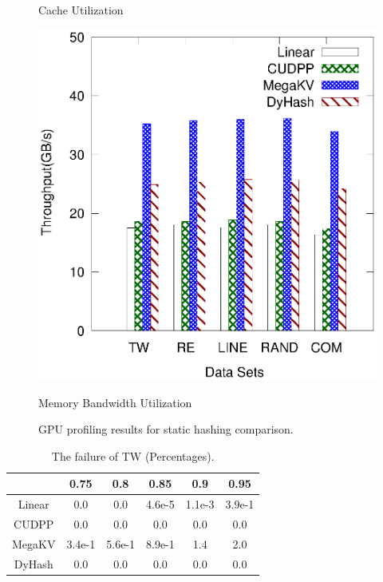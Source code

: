\begin{figure}[h]
\begin{minipage}{0.3\linewidth}
	\centerline{Cache Utilization}
\end{minipage}
	\hfill
	\begin{minipage}{0.3\linewidth}\centering
	\includegraphics[width=\linewidth]{pic/static-profi/memory-read.eps}
	\centerline{Memory Bandwidth Utilization}
	\end{minipage}
	\caption{GPU profiling results for static hashing comparison.}
	\label{fig:static:profile}
\end{figure}



\begin{table}[H]
 	\caption{The failure of TW (Percentages).}
	\centering
       \begin{tabular}{|c|c|c|c|c|c|}
		\hline
		       & 0.75 & 0.8 & 0.85 & 0.9 & 0.95\\ \hline
		Linear &0.0 & 0.0 &4.6e-5  & 1.1e-3 & 3.9e-1 \\ \hline
		CUDPP & 0.0 & 0.0 &0.0  & 0.0 & 0.0 \\ \hline
		MegaKV & 3.4e-1 & 5.6e-1 &8.9e-1 & 1.4 & 2.0 \\ \hline
		DyHash &0.0 & 0.0 &0.0  & 0.0 & 0.0 \\ \hline
	\end{tabular}
	\label{tab:fail:tw}
\end{table}

